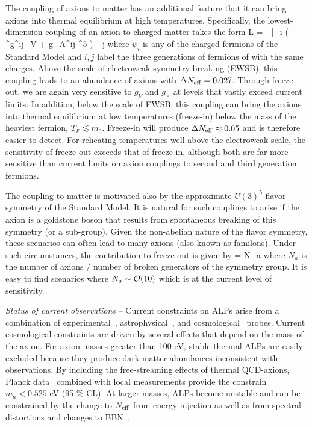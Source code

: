 The coupling of axions to matter has an additional feature that it can bring axions into thermal equilibrium at high temperatures.  Specifically, the lowest-dimension coupling of an axion to charged matter takes the form
\beq
{\cal L} = -  \bar \psi_i ( \gamma^\mu g^{ij}_V + g_A^{ij} \gamma^5 ) \psi_j
\eeq
where $\psi_{i}$ is any of the charged fermions of the Standard Model and $i,j$ label the three generations of fermions of with the same charges.  Above the scale of electroweak symmetry breaking (EWSB), this coupling leads to an abundance of axions with $\Delta N_{\rm eff} = 0.027$.  Through freeze-out, we are again very sensitive to $g_V$ and $g_A$ at levels that vastly exceed current limits.  In addition, below the scale of EWSB, this coupling can bring the axions into thermal equilibrium at low temperatures (freeze-in) below the mass of the heaviest fermion, $T_F \lesssim m_{3}$.  Freeze-in will produce $\Delta N_{\rm eff} \approx 0.05$ and is therefore easier to detect.  For reheating temperatures well above the electroweak scale, the sensitivity of freeze-out exceeds that of freeze-in, although both are far more sensitive than current limits on axion couplings to  second and third generation fermions.

The coupling to matter is motivated also by the approximate $U(3)^5$ flavor symmetry of the Standard Model.  It is natural for such couplings to arise if the axion is a goldstone boson that results from spontaneous breaking of this symmetry (or a sub-group).  Given the non-abelian nature of the flavor symmetry, these scenarios can often lead to many axions (also known as familons).  Under such circumstances, the contribution to freeze-out is given by 
\beq
\Delta \Neff = N_a 
\eeq
where $N_a$ is the number of axions / number of broken generators of the symmetry group.  It is easy to find scenarios where $N_a\sim {\cal O}(10)$ which is at the current level of sensitivity.


{\it Status of current observations} -- Current constraints on ALPs arise from a combination of experimental~\cite{Graham:2015ouw}, astrophysical~\cite{Raffelt:2012kt}, and cosmological~\cite{Marsh:2015xka} probes.  Current cosmological constraints are driven by several effects that depend on the mass of the axion.  For axion masses greater than 100 eV, stable thermal ALPs are easily excluded because they produce dark matter abundances inconsistent with observations.  By including the free-streaming effects of thermal QCD-axions,  Planck data~\cite{DiValentino:2015wba} combined with local measurements provide the constrain $m_a < 0.525$ eV (95 \% CL).  At larger masses, ALPs become unstable and can be constrained by the change to $N_{\rm eff}$ from energy injection as well as from spectral distortions and changes to BBN~\cite{Cadamuro:2011fd,Follin:2015hya}.


